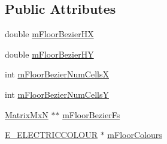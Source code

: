 \subsection*{Public Attributes}
\begin{DoxyCompactItemize}
\item 
double \hyperlink{class_floor_data_a38eed166299a5c25dd4358964afa0a2a}{m\-Floor\-Bezier\-H\-X}
\item 
double \hyperlink{class_floor_data_a264969dc13604a1a021e4b7084c2c00a}{m\-Floor\-Bezier\-H\-Y}
\item 
int \hyperlink{class_floor_data_a01fcc4a53643be6819fc3a8488436135}{m\-Floor\-Bezier\-Num\-Cells\-X}
\item 
int \hyperlink{class_floor_data_a79cc90d0b076ef2a7204d3f16480f1d5}{m\-Floor\-Bezier\-Num\-Cells\-Y}
\item 
\hyperlink{class_matrix_mx_n}{Matrix\-Mx\-N} $\ast$$\ast$ \hyperlink{class_floor_data_aef2684a379485861a0b2f81fe62df2df}{m\-Floor\-Bezier\-Fs}
\item 
\hyperlink{_electric_colour_8hpp_a1979e84576b59c4d100d8a8cc41de734}{E\-\_\-\-E\-L\-E\-C\-T\-R\-I\-C\-C\-O\-L\-O\-U\-R} $\ast$ \hyperlink{class_floor_data_aaf030f1c62c18bde64f0dbf3f6d08242}{m\-Floor\-Colours}
\end{DoxyCompactItemize}


